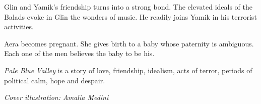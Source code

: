 \documentclass[
  spinewidth=0.8325in,
  coverwidth=6in,
  coverheight=9in,
  marklength=0.125in,
  bleedwidth=0.125in,
  12pt
]{bookcover}
\begin{document}
\begin{bookcover}
{{Glin and Yamik's friendship turns into a strong bond. The elevated
ideals of the Balads evoke in Glin the wonders of music. He readily
joins Yamik in his terrorist activities.

Aera becomes pregnant. She gives birth to a baby whose paternity is
ambiguous. Each one of the men believes the baby to be his.

\emph{Pale Blue Valley} is a story of love, friendship, idealism, acts of
terror, periods of political calm, hope and despair.

\textit{Cover illustration: Amalia Medini}
    }

}


\end{bookcover}
\end{document}
